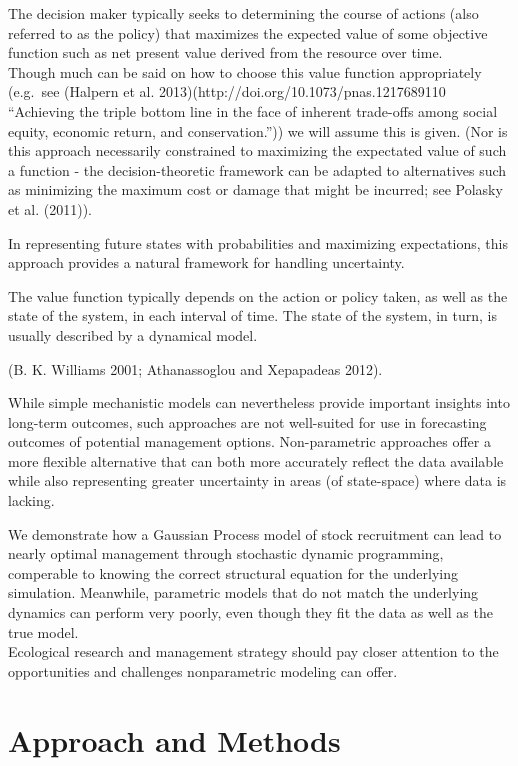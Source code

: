 \documentclass[author-year, review]{elsarticle} %
\begin{document}
The decision maker typically seeks to determining the course of actions
(also referred to as the policy) that maximizes the expected value of
some objective function such as net present value derived from the
resource over time.\\Though much can be said on how to choose this value
function appropriately (e.g.~see (Halpern et al.
2013)(http://doi.org/10.1073/pnas.1217689110 ``Achieving the triple
bottom line in the face of inherent trade-offs among social equity,
economic return, and conservation.'')) we will assume this is given.
(Nor is this approach necessarily constrained to maximizing the
expectated value of such a function - the decision-theoretic framework
can be adapted to alternatives such as minimizing the maximum cost or
damage that might be incurred; see Polasky et al. (2011)).

In representing future states with probabilities and maximizing
expectations, this approach provides a natural framework for handling
uncertainty.

The value function typically depends on the action or policy taken, as
well as the state of the system, in each interval of time. The state of
the system, in turn, is usually described by a dynamical model.

(B. K. Williams 2001; Athanassoglou and Xepapadeas 2012).

While simple mechanistic models can nevertheless provide important
insights into long-term outcomes, such approaches are not well-suited
for use in forecasting outcomes of potential management options.
Non-parametric approaches offer a more flexible alternative that can
both more accurately reflect the data available while also representing
greater uncertainty in areas (of state-space) where data is lacking.

We demonstrate how a Gaussian Process model of stock recruitment can
lead to nearly optimal management through stochastic dynamic
programming, comperable to knowing the correct structural equation for
the underlying simulation. Meanwhile, parametric models that do not
match the underlying dynamics can perform very poorly, even though they
fit the data as well as the true model.\\Ecological research and
management strategy should pay closer attention to the opportunities and
challenges nonparametric modeling can offer.

\section{Approach and Methods}\label{approach-and-methods-1}
\end{document}
